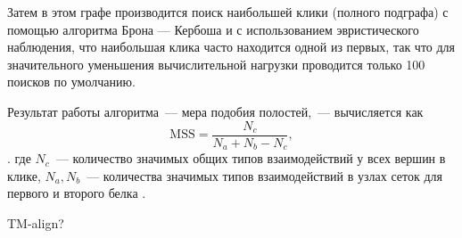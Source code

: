 \documentclass[a4paper,14pt]{article}         %
\begin{document}
Затем в этом графе производится поиск наибольшей клики (полного подграфа) с помощью алгоритма Брона — Кербоша \cite{Bron1973, Tomita2006} и с использованием эвристического наблюдения, что наибольшая клика часто находится одной из первых, так что для значительного уменьшения вычислительной нагрузки проводится только 100 поисков по умолчанию. 

Результат работы алгоритма~--- мера подобия полостей,~--- вычисляется как
\begin{equation}
\text{MSS} = \frac{N_c}{N_a + N_b - N_c},
\end{equation} .
где $N_c$~--- количество значимых общих типов взаимодействий у всех вершин в клике, $N_a, N_b$~--- количества значимых типов взаимодействий в узлах сеток для первого и второго белка \cite{Chartier2015}.  

\color{orange} TM-align?\color{black}
\end{document}
